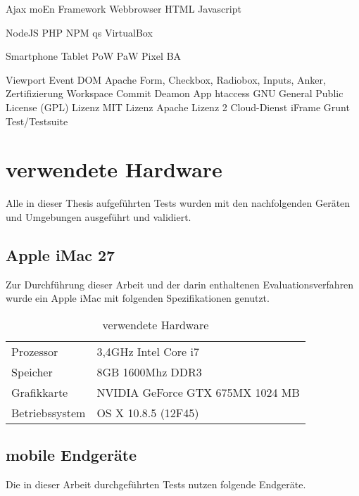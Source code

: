 		\Gls{Ajax}
		\Gls{moEn}
		\Gls{Framework}
		\Gls{Webbrowser}
		\Gls{HTML}
		\Gls{Javascript}
		
		\Gls{NodeJS}
		\Gls{PHP}
		\Gls{NPM}
		\Gls{qs}
		\Gls{VirtualBox}
		
		\Gls{Smartphone}
		\Gls{Tablet}
		\Gls{PoW}
		\Gls{PaW}
		\Gls{Pixel}
		\Gls{BA}
		
		\Gls{Viewport}
		\Gls{Event}
		\Gls{DOM}
		\Gls{Apache}
		\Gls{Form, Checkbox, Radiobox, Inputs, Anker, Zertifizierung}
		\Gls{Workspace}
		\Gls{Commit}
		\Gls{Deamon}
		\Gls{App}
		\Gls{htaccess}
		\Gls{GNU General Public License (GPL) Lizenz}
		\Gls{MIT Lizenz}
		\Gls{Apache Lizenz 2}
		\Gls{Cloud-Dienst}
		\Gls{iFrame}
		\Gls{Grunt}
		\Gls{Test/Testsuite}
	
	\pagebreak
	\section{verwendete Hardware}
	Alle in dieser Thesis aufgeführten Tests wurden mit den nachfolgenden Geräten und Umgebungen ausgeführt und validiert.
	
	\subsection{Apple iMac 27\texttt\dq}
	Zur Durchführung dieser Arbeit und der darin enthaltenen Evaluationsverfahren wurde ein Apple iMac mit folgenden 				Spezifikationen genutzt.
	
	\begin{table}[H]
	 \vspace{-20pt}
 		\centering
			\begin{tabular}{| p{4cm} | p{8cm}  |}
			\hline
				Prozessor			&	3,4GHz Intel Core i7 \\
				Speicher			&	8GB 1600Mhz DDR3\\
				Grafikkarte		&	NVIDIA GeForce GTX 675MX 1024 MB\\
				Betriebssystem		&	OS X 10.8.5 (12F45)\\

				\hline
				\end{tabular}
			\caption{verwendete Hardware}
	\end{table}

	\subsection{mobile Endgeräte}
	Die in dieser Arbeit durchgeführten Tests nutzen folgende Endgeräte. 
	
